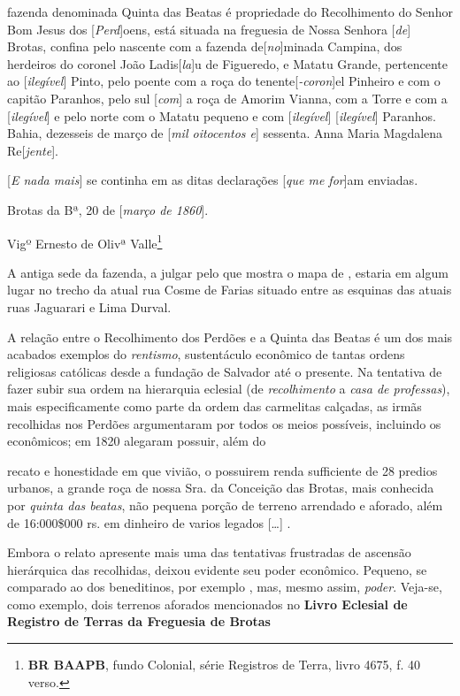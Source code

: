 \begin{citacao}
\begin{citacao}
 fazenda denominada Quinta das Beatas é propriedade do Recolhimento do Senhor Bom Jesus dos [\textit{Perd}]oens, está situada na freguesia de Nossa Senhora [\textit{de}] Brotas, confina pelo nascente com a fazenda de[\textit{no}]minada Campina, dos herdeiros do coronel João Ladis[\textit{la}]u de Figueredo, e Matatu Grande, pertencente ao [\textit{ilegível}] Pinto, pelo poente com a roça do tenente[\textit{-coron}]el Pinheiro e com o capitão Paranhos, pelo sul [\textit{com}] a roça de Amorim Vianna, com a Torre e com a [\textit{ilegível}] e pelo norte com o Matatu pequeno e com [\textit{ilegível}] [\textit{ilegível}] Paranhos. Bahia, dezesseis de março de [\textit{mil oitocentos e}] sessenta. Anna Maria Magdalena Re[\textit{jente}]. 

[\textit{E nada mais}] se continha em as ditas declarações [\textit{que me for}]am enviadas.

Brotas da Bª, 20 de [\textit{março de 1860}].

Vigº Ernesto de Olivª Valle\footnote{\textbf{BR BAAPB}, fundo Colonial, série Registros de Terra, livro 4675, f. 40 verso.}
\end{citacao}

A antiga sede da fazenda, a julgar pelo que mostra o mapa de , estaria em algum lugar no trecho da atual rua Cosme de Farias situado entre as esquinas das atuais ruas Jaguarari e Lima Durval.

A relação entre o Recolhimento dos Perdões e a Quinta das Beatas é um dos mais acabados exemplos do \textit{rentismo}, sustentáculo econômico de tantas ordens religiosas católicas desde a fundação de Salvador até o presente. Na tentativa de fazer subir sua ordem na hierarquia eclesial (de \textit{recolhimento} a \textit{casa de professas}), mais especificamente como parte da ordem das carmelitas calçadas, as irmãs recolhidas nos Perdões argumentaram por todos os meios possíveis, incluindo os econômicos; em 1820 alegaram possuir, além do 

\begin{citacao}
recato e honestidade em que vivião, o possuirem renda sufficiente de 28 predios urbanos, a grande roça de nossa Sra. da Conceição das Brotas, mais conhecida por \textit{quinta das beatas}, não pequena porção de terreno arrendado e aforado, além de 16:000\$000 rs. em dinheiro de varios legados [\dots] \cite[p.~231]{accioli_memorias5_1937}.
\end{citacao}

Embora o relato apresente mais uma das tentativas frustradas de ascensão hierárquica das recolhidas, deixou evidente seu poder econômico. Pequeno, se comparado ao dos beneditinos, por exemplo \cite{bento_tombo_1945}, mas, mesmo assim, \textit{poder}. Veja-se, como exemplo, dois terrenos aforados mencionados no \textbf{Livro Eclesial de Registro de Terras da Freguesia de Brotas}


\end{citacao}
